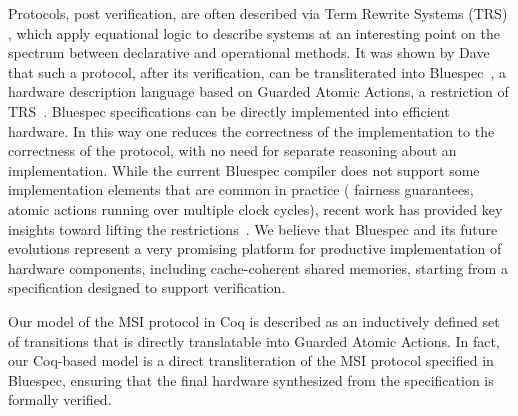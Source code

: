 Protocols, post verification, are often described via Term Rewrite Systems
(TRS) , which apply equational logic to describe
systems at an interesting point on the spectrum between declarative and
operational methods.  It was shown by Dave
\etal{}~\cite{DNA:CoherenceImplementation} that such a protocol, after its
verification, can be transliterated into Bluespec~\cite{Bluespec:TFRG}, a
hardware description language based on Guarded Atomic Actions, a restriction of
TRS~\cite{Hoe:TCAD}. Bluespec specifications can be directly implemented into
efficient hardware. In this way one reduces the correctness of the
implementation to the correctness of the protocol, with no need for separate
reasoning about an implementation. While the current Bluespec compiler does not
support some implementation elements that are common in practice (\eg{}
fairness guarantees, atomic actions running over multiple clock cycles), recent
work has provided key insights toward lifting the
restrictions~\cite{Karczmarek}. We believe that Bluespec and its future
evolutions represent a very promising platform for productive implementation of
hardware components, including cache-coherent shared memories, starting from a
specification designed to support verification.

Our model of the MSI protocol
in Coq is described as an inductively defined set of transitions that is
directly translatable into Guarded Atomic Actions. In fact, our Coq-based model
is a direct transliteration of the MSI protocol specified in Bluespec,
ensuring that the final hardware synthesized from the specification is formally
verified.

%

